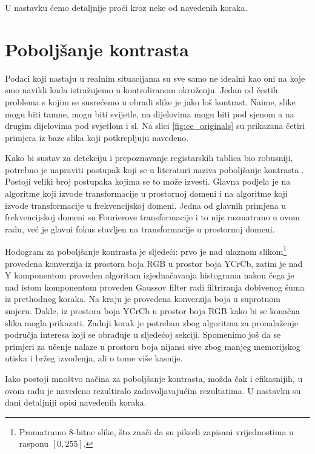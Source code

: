 \documentclass[times, utf8, diplomski]{fer}
\begin{document}
U nastavku ćemo detaljnije proći kroz neke od navedenih koraka.

\section{Poboljšanje kontrasta}
Podaci koji nastaju u realnim situacijama su sve samo ne idealni kao oni na koje smo navikli kada istražujemo u kontroliranom okruženju. Jedan od čestih problema s kojim se susrećemo u obradi slike je jako loš kontrast. Naime, slike mogu biti tamne, mogu biti svijetle, na dijelovima mogu biti pod sjenom a na drugim dijelovima pod svjetlom i sl. Na slici \ref{fig:ce_originals} su prikazana četiri primjera iz baze slika koji potkrepljuju navedeno.

Kako bi sustav za detekciju i prepoznavanje registarskih tablica bio robusniji, potrebno je napraviti postupak koji se u literaturi naziva poboljšanje kontrasta  \citep{szeliski}. Postoji veliki broj postupaka kojima se to može izvesti. Glavna podjela je na algoritme koji izvode transformacije u prostornoj  domeni i na algoritme koji izvode transformacije u frekvencijskoj  domeni. Jedna od glavnih primjena u frekvencijskoj domeni su Fourierove transformacije i to nije razmatrano u ovom radu, već je glavni fokus stavljen na transformacije u prostornoj domeni.

Hodogram za poboljšanje kontrasta je sljedeći: prvo je nad ulaznom slikom\footnote{Promatramo 8-bitne slike, što znači da su pikseli zapisani vrijednostima u rasponu $[0,255]$.} provedena konverzija iz prostora boja RGB u prostor boja YCrCb, zatim je nad Y komponentom proveden algoritam izjednačavanja histograma nakon čega je nad istom komponentom proveden Gaussov filter radi filtriranja dobivenog šuma iz prethodnog koraka. Na kraju je provedena konverzija boja u suprotnom smjeru. Dakle, iz prostora boja YCrCb u prostor boja RGB kako bi se konačna slika mogla prikazati. Zadnji korak je potreban zbog algoritma za pronalaženje područja interesa koji se obrađuje u sljedećoj sekciji. Spomenimo još da se primjeri za učenje nalaze u prostoru boja nijansi sive  zbog manjeg memorijskog utiska i bržeg izvođenja, ali o tome više kasnije.

Iako postoji mnoštvo načina za poboljšanje kontrasta, možda čak i efikasnijih, u ovom radu je navedeno rezultiralo zadovoljavajućim rezultatima. U nastavku su dani detaljniji opisi navedenih koraka.

\bigskip
\end{document}
